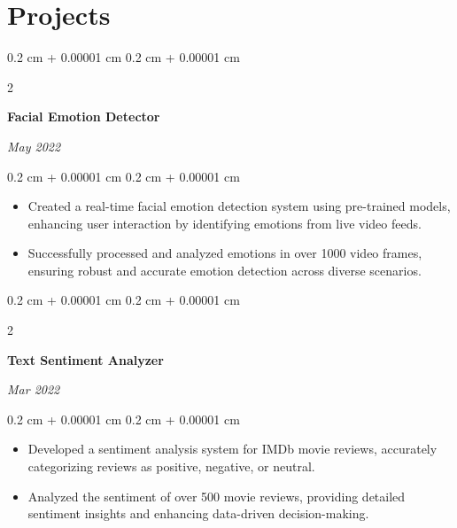 \documentclass[12pt, letterpaper]{article}
\newenvironment{highlights}{
    \begin{itemize}[
        topsep=0.10 cm,
        parsep=0.10 cm,
        partopsep=0pt,
        itemsep=0pt,
        leftmargin=0.4 cm + 10pt
    ]
}{
    \end{itemize}
} %
\newenvironment{onecolentry}{
    \begin{adjustwidth}{
        0.2 cm + 0.00001 cm
    }{
        0.2 cm + 0.00001 cm
    }
}{
    \end{adjustwidth}
} %
\newenvironment{twocolentry}[2][]{
    \onecolentry
    \def\secondColumn{#2}
    \setcolumnwidth{\fill, 4.5 cm}
    \begin{paracol}{2}
}{
    \switchcolumn \raggedleft \secondColumn
    \end{paracol}
    \endonecolentry
} %
\begin{document}
    
    \section{Projects}



        
        \begin{twocolentry}{


        \textit{May 2022}}
            \textbf{Facial Emotion Detector}
        \end{twocolentry}

        \vspace{0.10 cm}
        \begin{onecolentry}
            \begin{highlights}
                \item Created a real-time facial emotion detection system using pre-trained models, enhancing user interaction by identifying emotions from live video feeds.
                \item Successfully processed and analyzed emotions in over 1000 video frames, ensuring robust and accurate emotion detection across diverse scenarios.
            \end{highlights}
        \end{onecolentry}


        \vspace{0.2 cm}

        \begin{twocolentry}{


        \textit{Mar 2022}}
            \textbf{Text Sentiment Analyzer}
        \end{twocolentry}

        \vspace{0.10 cm}
        \begin{onecolentry}
            \begin{highlights}
                \item Developed a sentiment analysis system for IMDb movie reviews, accurately categorizing reviews as positive, negative, or neutral.
                \item Analyzed the sentiment of over 500 movie reviews, providing detailed sentiment insights and enhancing data-driven decision-making.
            \end{highlights}
        \end{onecolentry}


        \vspace{0.2 cm}
\end{document}
